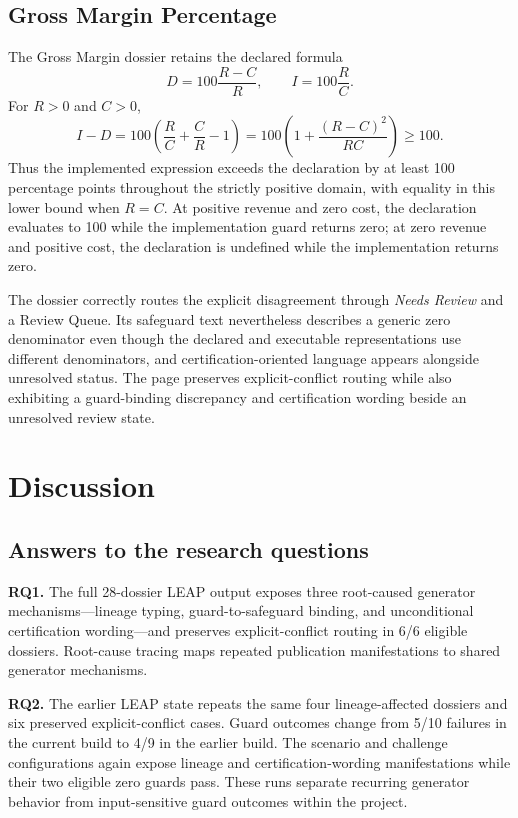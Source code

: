 \documentclass[a4paper,fleqn]{cas-dc}
\begin{document}
\subsection{Gross Margin Percentage}
The Gross Margin dossier retains the declared formula
\[
D=100\frac{R-C}{R}, \qquad I=100\frac{R}{C}.
\]
For $R>0$ and $C>0$,
\[
I-D=100\left(\frac{R}{C}+\frac{C}{R}-1\right)
=100\left(1+\frac{(R-C)^2}{RC}\right)\ge 100.
\]
Thus the implemented expression exceeds the declaration by at least 100 percentage points throughout the strictly positive domain, with equality in this lower bound when $R=C$. At positive revenue and zero cost, the declaration evaluates to 100 while the implementation guard returns zero; at zero revenue and positive cost, the declaration is undefined while the implementation returns zero.

The dossier correctly routes the explicit disagreement through \emph{Needs Review} and a Review Queue. Its safeguard text nevertheless describes a generic zero denominator even though the declared and executable representations use different denominators, and certification-oriented language appears alongside unresolved status. The page preserves explicit-conflict routing while also exhibiting a guard-binding discrepancy and certification wording beside an unresolved review state.

\section{Discussion}
\subsection{Answers to the research questions}
\textbf{RQ1.} The full 28-dossier LEAP output exposes three root-caused generator mechanisms---lineage typing, guard-to-safeguard binding, and unconditional certification wording---and preserves explicit-conflict routing in 6/6 eligible dossiers. Root-cause tracing maps repeated publication manifestations to shared generator mechanisms.

\textbf{RQ2.} The earlier LEAP state repeats the same four lineage-affected dossiers and six preserved explicit-conflict cases. Guard outcomes change from 5/10 failures in the current build to 4/9 in the earlier build. The scenario and challenge configurations again expose lineage and certification-wording manifestations while their two eligible zero guards pass. These runs separate recurring generator behavior from input-sensitive guard outcomes within the project.
\end{document}

